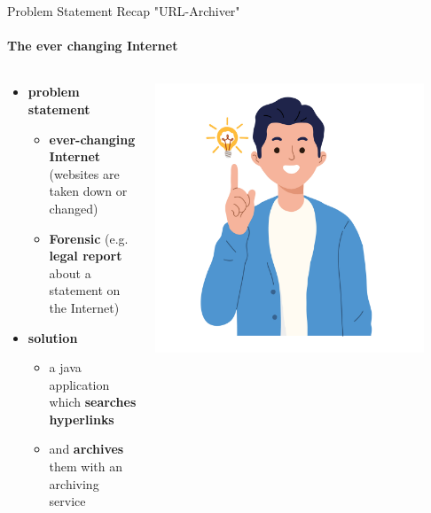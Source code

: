 \documentclass[
ngerman,%
authorontitle=true,
]{bfhbeamer}
\begin{document}
	\begin{frame}{Problem Statement Recap "URL-Archiver"}
		\framesubtitle{The ever changing Internet}
		\begin{columns} %
			\begin{column}{0.7\textwidth} %
				\begin{itemize}
					\item \textbf{problem statement}
					\begin{itemize}
						\item \textbf{ever-changing Internet} (websites are taken down or changed)
						\item \textbf{Forensic} (e.g. \textbf{legal report} about a statement on the Internet)
					\end{itemize}
					\bigskip
					\item \textbf{solution}
					\begin{itemize}
						\item a java application which \textbf{searches hyperlinks}
						\item and \textbf{archives} them with an archiving service
					\end{itemize}
				\end{itemize}
			\end{column}
			\begin{column}{0.3\textwidth} %
				\begin{center}
					\includegraphics[width=0.9\textwidth]{pictures/final_presentation/idea.jpg}
				\end{center}
			\end{column}
		\end{columns}
	\end{frame}
	
\end{document}
